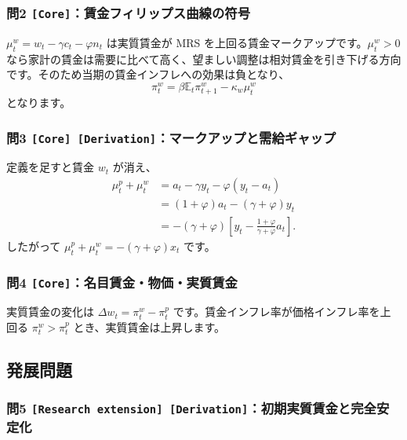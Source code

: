\documentclass[
  japanese,
  lualatex,
  ja=standard,
  11pt,
  a4paper]{ltjsarticle}
\begin{document}
\subsubsection{\texorpdfstring{問2
\texttt{{[}Core{]}}：賃金フィリップス曲線の符号}{問2 {[}Core{]}：賃金フィリップス曲線の符号}}\label{ux554f2-coreux8cc3ux91d1ux30d5ux30a3ux30eaux30c3ux30d7ux30b9ux66f2ux7ddaux306eux7b26ux53f7}

\(\mu_t^w=w_t-\gamma c_t-\varphi n_t\) は実質賃金が MRS
を上回る賃金マークアップです。\(\mu_t^w>0\)
なら家計の賃金は需要に比べて高く、望ましい調整は相対賃金を引き下げる方向です。そのため当期の賃金インフレへの効果は負となり、
\[
\pi_t^w=\beta\mathbb E_t\pi_{t+1}^w-\kappa_w\mu_t^w
\] となります。

\subsubsection{\texorpdfstring{問3
\texttt{{[}Core{]}\ {[}Derivation{]}}：マークアップと需給ギャップ}{問3 {[}Core{]} {[}Derivation{]}：マークアップと需給ギャップ}}\label{ux554f3-core-derivationux30deux30fcux30afux30a2ux30c3ux30d7ux3068ux9700ux7d66ux30aeux30e3ux30c3ux30d7}

定義を足すと賃金 \(w_t\) が消え、 \[
\begin{aligned}
\mu_t^p+\mu_t^w
&=a_t-\gamma y_t-\varphi(y_t-a_t)\\
&=(1+\varphi)a_t-(\gamma+\varphi)y_t\\
&=-(\gamma+\varphi)
\left[y_t-\frac{1+\varphi}{\gamma+\varphi}a_t\right].
\end{aligned}
\] したがって \(\mu_t^p+\mu_t^w=-(\gamma+\varphi)x_t\) です。

\subsubsection{\texorpdfstring{問4
\texttt{{[}Core{]}}：名目賃金・物価・実質賃金}{問4 {[}Core{]}：名目賃金・物価・実質賃金}}\label{ux554f4-coreux540dux76eeux8cc3ux91d1ux7269ux4fa1ux5b9fux8ceaux8cc3ux91d1}

実質賃金の変化は \(\Delta w_t=\pi_t^w-\pi_t^p\)
です。賃金インフレ率が価格インフレ率を上回る \(\pi_t^w>\pi_t^p\)
とき、実質賃金は上昇します。

\subsection{発展問題}\label{ux767aux5c55ux554fux984c-9}

\subsubsection{\texorpdfstring{問5
\texttt{{[}Research\ extension{]}\ {[}Derivation{]}}：初期実質賃金と完全安定化}{問5 {[}Research extension{]} {[}Derivation{]}：初期実質賃金と完全安定化}}\label{ux554f5-research-extension-derivationux521dux671fux5b9fux8ceaux8cc3ux91d1ux3068ux5b8cux5168ux5b89ux5b9aux5316}
\end{document}
